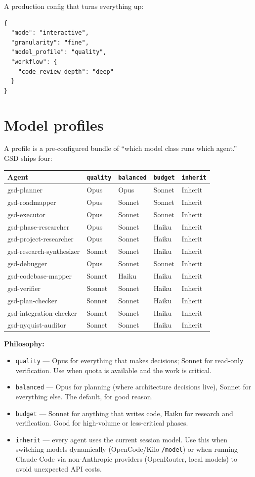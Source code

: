 \documentclass[11pt,letterpaper,openany]{book}
\begin{document}
A production config that turns everything up:

\begin{lstlisting}
{
  "mode": "interactive",
  "granularity": "fine",
  "model_profile": "quality",
  "workflow": {
    "code_review_depth": "deep"
  }
}
\end{lstlisting}

\section{Model profiles}

A profile is a pre-configured bundle of ``which model class runs which agent.'' GSD ships four:

\begin{tabularx}{\textwidth}{l l l l l}
\toprule
\textbf{Agent} & \texttt{quality} & \texttt{balanced} & \texttt{budget} & \texttt{inherit} \\
\midrule
gsd-planner & Opus & Opus & Sonnet & Inherit \\
gsd-roadmapper & Opus & Sonnet & Sonnet & Inherit \\
gsd-executor & Opus & Sonnet & Sonnet & Inherit \\
gsd-phase-researcher & Opus & Sonnet & Haiku & Inherit \\
gsd-project-researcher & Opus & Sonnet & Haiku & Inherit \\
gsd-research-synthesizer & Sonnet & Sonnet & Haiku & Inherit \\
gsd-debugger & Opus & Sonnet & Sonnet & Inherit \\
gsd-codebase-mapper & Sonnet & Haiku & Haiku & Inherit \\
gsd-verifier & Sonnet & Sonnet & Haiku & Inherit \\
gsd-plan-checker & Sonnet & Sonnet & Haiku & Inherit \\
gsd-integration-checker & Sonnet & Sonnet & Haiku & Inherit \\
gsd-nyquist-auditor & Sonnet & Sonnet & Haiku & Inherit \\
\bottomrule
\end{tabularx}

\textbf{Philosophy:}

\begin{itemize}[itemsep=2pt]
  \item \texttt{quality} --- Opus for everything that makes decisions; Sonnet for read-only verification. Use when quota is available and the work is critical.
  \item \texttt{balanced} --- Opus for planning (where architecture decisions live), Sonnet for everything else. The default, for good reason.
  \item \texttt{budget} --- Sonnet for anything that writes code, Haiku for research and verification. Good for high-volume or less-critical phases.
  \item \texttt{inherit} --- every agent uses the current session model. Use this when switching models dynamically (OpenCode/Kilo \texttt{/model}) or when running Claude Code via non-Anthropic providers (OpenRouter, local models) to avoid unexpected API costs.
\end{itemize}
\end{document}
